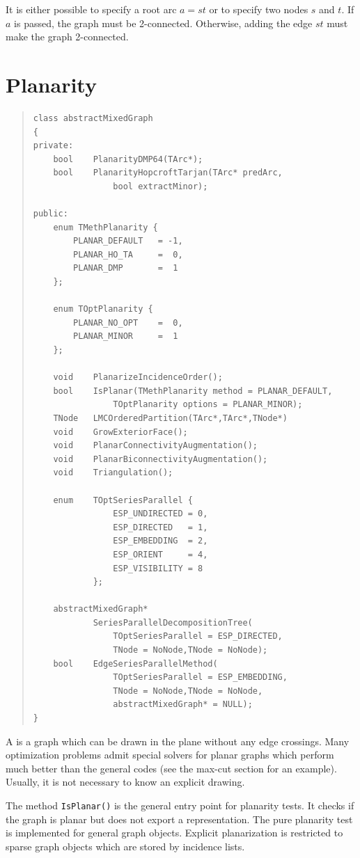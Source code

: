 \documentclass[a4paper,11pt,twoside]{book}
\begin{document}
\begin{multicols}{2}
It is either possible to specify a root arc $a=st$ or to specify two nodes $s$
and $t$. If $a$ is passed, the graph must be 2-connected. Otherwise, adding the
edge $st$ must make the graph 2-connected.


\vfill
{}
\section{Planarity}
\label{slb_planarity}
\methods
\begin{quote}
\begin{verbatim}
class abstractMixedGraph
{
private:
    bool    PlanarityDMP64(TArc*);
    bool    PlanarityHopcroftTarjan(TArc* predArc,
                bool extractMinor);

public:
    enum TMethPlanarity {
        PLANAR_DEFAULT   = -1,
        PLANAR_HO_TA     =  0,
        PLANAR_DMP       =  1
    };

    enum TOptPlanarity {
        PLANAR_NO_OPT    =  0,
        PLANAR_MINOR     =  1
    };

    void    PlanarizeIncidenceOrder();
    bool    IsPlanar(TMethPlanarity method = PLANAR_DEFAULT,
                TOptPlanarity options = PLANAR_MINOR);
    TNode   LMCOrderedPartition(TArc*,TArc*,TNode*)
    void    GrowExteriorFace();
    void    PlanarConnectivityAugmentation();
    void    PlanarBiconnectivityAugmentation();
    void    Triangulation();

    enum    TOptSeriesParallel {
                ESP_UNDIRECTED = 0,
                ESP_DIRECTED   = 1,
                ESP_EMBEDDING  = 2,
                ESP_ORIENT     = 4,
                ESP_VISIBILITY = 8
            };

    abstractMixedGraph*
            SeriesParallelDecompositionTree(
                TOptSeriesParallel = ESP_DIRECTED,
                TNode = NoNode,TNode = NoNode);
    bool    EdgeSeriesParallelMethod(
                TOptSeriesParallel = ESP_EMBEDDING,
                TNode = NoNode,TNode = NoNode,
                abstractMixedGraph* = NULL);
}
\end{verbatim}
\end{quote}
A  is a graph which can be drawn in the plane without any
edge crossings. Many optimization problems admit special solvers for planar
graphs which perform much better than the general codes (see the max-cut
section for an example). Usually, it is not necessary to know an explicit
drawing.

The method \verb/IsPlanar()/ is the general entry point for planarity tests.
It checks if the graph is planar but does not export a representation.
The pure planarity test is implemented for general graph objects.
Explicit planarization is restricted to sparse graph objects which are stored
by incidence lists.



\end{multicols}
\end{document}
